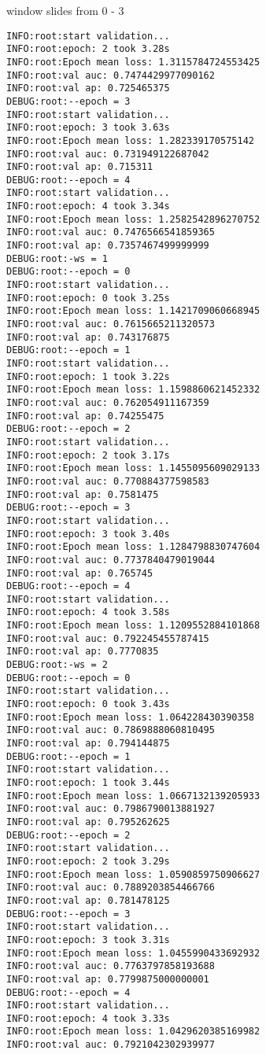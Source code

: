 \documentclass[11pt]{article}
\begin{document}
window slides from 0 - 3
\begin{verbatim}
INFO:root:start validation...
INFO:root:epoch: 2 took 3.28s
INFO:root:Epoch mean loss: 1.3115784724553425
INFO:root:val auc: 0.7474429977090162
INFO:root:val ap: 0.725465375
DEBUG:root:--epoch = 3
INFO:root:start validation...
INFO:root:epoch: 3 took 3.63s
INFO:root:Epoch mean loss: 1.282339170575142
INFO:root:val auc: 0.731949122687042
INFO:root:val ap: 0.715311
DEBUG:root:--epoch = 4
INFO:root:start validation...
INFO:root:epoch: 4 took 3.34s
INFO:root:Epoch mean loss: 1.2582542896270752
INFO:root:val auc: 0.7476566541859365
INFO:root:val ap: 0.7357467499999999
DEBUG:root:-ws = 1
DEBUG:root:--epoch = 0
INFO:root:start validation...
INFO:root:epoch: 0 took 3.25s
INFO:root:Epoch mean loss: 1.1421709060668945
INFO:root:val auc: 0.7615665211320573
INFO:root:val ap: 0.743176875
DEBUG:root:--epoch = 1
INFO:root:start validation...
INFO:root:epoch: 1 took 3.22s
INFO:root:Epoch mean loss: 1.1598860621452332
INFO:root:val auc: 0.762054911167359
INFO:root:val ap: 0.74255475
DEBUG:root:--epoch = 2
INFO:root:start validation...
INFO:root:epoch: 2 took 3.17s
INFO:root:Epoch mean loss: 1.1455095609029133
INFO:root:val auc: 0.770884377598583
INFO:root:val ap: 0.7581475
DEBUG:root:--epoch = 3
INFO:root:start validation...
INFO:root:epoch: 3 took 3.40s
INFO:root:Epoch mean loss: 1.1284798830747604
INFO:root:val auc: 0.7737840479019044
INFO:root:val ap: 0.765745
DEBUG:root:--epoch = 4
INFO:root:start validation...
INFO:root:epoch: 4 took 3.58s
INFO:root:Epoch mean loss: 1.1209552884101868
INFO:root:val auc: 0.792245455787415
INFO:root:val ap: 0.7770835
DEBUG:root:-ws = 2
DEBUG:root:--epoch = 0
INFO:root:start validation...
INFO:root:epoch: 0 took 3.43s
INFO:root:Epoch mean loss: 1.064228430390358
INFO:root:val auc: 0.7869888060810495
INFO:root:val ap: 0.794144875
DEBUG:root:--epoch = 1
INFO:root:start validation...
INFO:root:epoch: 1 took 3.44s
INFO:root:Epoch mean loss: 1.0667132139205933
INFO:root:val auc: 0.7986790013881927
INFO:root:val ap: 0.795262625
DEBUG:root:--epoch = 2
INFO:root:start validation...
INFO:root:epoch: 2 took 3.29s
INFO:root:Epoch mean loss: 1.0590859750906627
INFO:root:val auc: 0.7889203854466766
INFO:root:val ap: 0.781478125
DEBUG:root:--epoch = 3
INFO:root:start validation...
INFO:root:epoch: 3 took 3.31s
INFO:root:Epoch mean loss: 1.0455990433692932
INFO:root:val auc: 0.7763797858193688
INFO:root:val ap: 0.7799875000000001
DEBUG:root:--epoch = 4
INFO:root:start validation...
INFO:root:epoch: 4 took 3.33s
INFO:root:Epoch mean loss: 1.0429620385169982
INFO:root:val auc: 0.7921042302939977

\end{verbatim}
\end{document}
